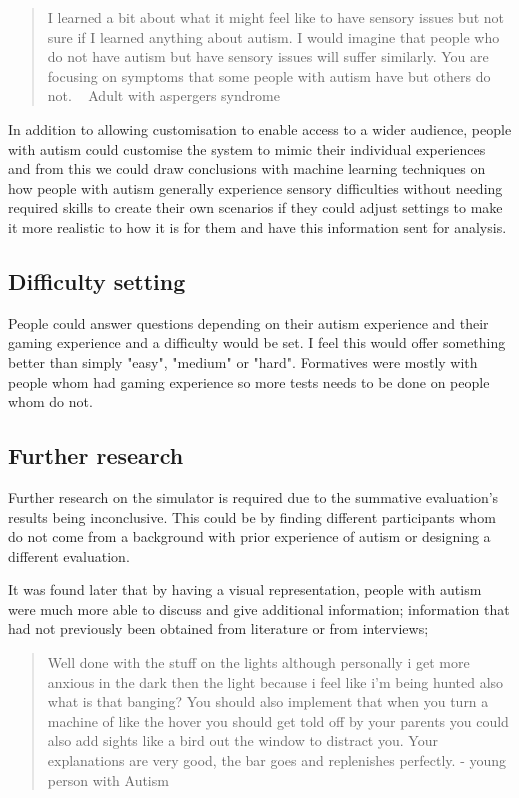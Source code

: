 \documentclass[11pt]{report}
\begin{document}
\begin{quote}
I learned a bit about what it might feel like to have sensory issues but not sure if I learned anything about autism. I would imagine that people who do not have autism but have sensory issues will suffer similarly. You are focusing on symptoms that some people with autism have but others do not. ~ Adult with aspergers syndrome
\end{quote}

In addition to allowing customisation to enable access to a wider audience, people with autism could customise the system to mimic their individual experiences and from this we could draw conclusions with machine learning techniques on how people with autism generally experience sensory difficulties without needing required skills to create their own scenarios if they could adjust settings to make it more realistic to how it is for them and have this information sent for analysis.

\subsection{Difficulty setting}
People could answer questions depending on their autism experience and their gaming experience and a difficulty would be set. I feel this would offer something better than simply "easy", "medium" or "hard". Formatives were mostly with people whom had gaming experience so more tests needs to be done on people whom do not.

\subsection{Further research}
\label{conc_furtherresearch}
Further research on the simulator is required due to the summative evaluation's results being inconclusive. This could be by finding different participants whom do not come from a background with prior experience of autism or designing a different evaluation. 

It was found later that by having a visual representation, people with autism were much more able to discuss and give additional information; information that had not previously been obtained from literature or from interviews; 

\begin{quote}
Well done with the stuff on the lights although personally i get more anxious in the dark then the light because i feel like i'm being hunted also what is that banging? You should also implement that when you turn a machine of like the hover you should get told off by your parents you could also add sights like a bird out the window to distract you. Your explanations are very good, the bar goes and replenishes perfectly. - young person with Autism
\end{quote}
\end{document}
